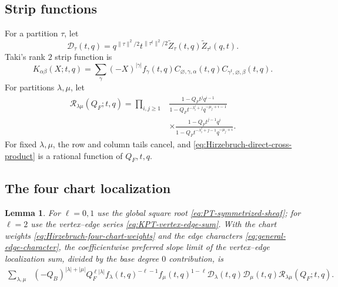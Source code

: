 \documentclass{amsart}
\newtheorem{lemma}{Lemma}
\theoremstyle{definition}
\numberwithin{equation}{section}
\begin{document}
\subsection{Strip functions}
For a partition \(\tau\), let
\[
 \mathscr D_\tau(t,q)
 =q^{\|\tau\|^2/2}t^{\|\tau^t\|^2/2}
  \widetilde Z_\tau(t,q)\widetilde Z_{\tau^t}(q,t).
\]
Taki's rank \(2\) strip function is
\begin{equation}
 K_{\alpha\beta}(X;t,q)
 =\sum_\gamma(-X)^{|\gamma|}f_\gamma(t,q)
 C_{\varnothing,\gamma,\alpha}(t,q)
 C_{\gamma^t,\varnothing,\beta}(t,q).
\label{eq:Taki-strip-function}
\end{equation}
For partitions \(\lambda,\mu\), let
\begin{equation}
\begin{aligned}
 \mathscr R_{\lambda\mu}(Q_F;t,q)
 =\prod_{i,j\geq1}
 &\frac{1-Q_Ft^jq^{i-1}}
       {1-Q_Ft^{-\lambda_i^t+j}q^{-\mu_j+i-1}}\\
 &\times
 \frac{1-Q_Ft^{j-1}q^i}
       {1-Q_Ft^{-\lambda_i^t+j-1}q^{-\mu_j+i}}.
\end{aligned}
\label{eq:Hirzebruch-direct-cross-product}
\end{equation}
For fixed \(\lambda,\mu\), the row and column tails cancel, and \eqref{eq:Hirzebruch-direct-cross-product} is a rational function of \(Q_F,t,q\).

\subsection{The four chart localization}
\begin{lemma}
\label{lem:Hirzebruch-four-chart-normalization}
For \(\ell=0,1\) use the global square root \eqref{eq:PT-symmetrized-sheaf}; for \(\ell=2\) use the vertex--edge series \eqref{eq:KPT-vertex-edge-sum}.  With the chart weights \eqref{eq:Hirzebruch-four-chart-weights} and the edge characters \eqref{eq:general-edge-character}, the coefficientwise preferred slope limit of the vertex--edge localization sum, divided by the base degree \(0\) contribution, is
\begin{equation}
\begin{aligned}
 \sum_{\lambda,\mu}
 &(-Q_B)^{|\lambda|+|\mu|}Q_F^{\ell|\lambda|}
 f_\lambda(t,q)^{-\ell-1}f_\mu(t,q)^{1-\ell}
 \mathscr D_\lambda(t,q)\mathscr D_\mu(t,q)
 \mathscr R_{\lambda\mu}(Q_F;t,q).
\end{aligned}
\label{eq:Hirzebruch-four-chart-result}
\end{equation}
\end{lemma}
\end{document}
